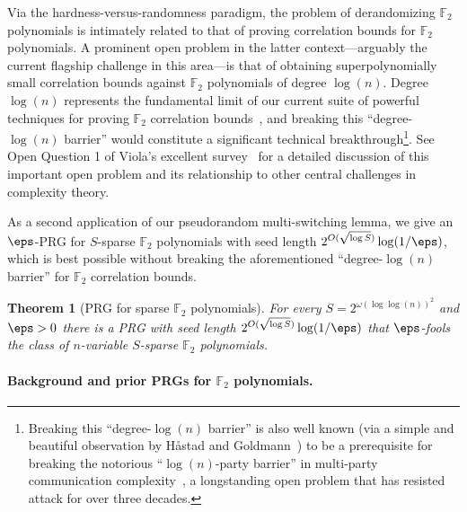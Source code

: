 \documentclass[11pt]{article}
\numberwithin{equation}{section}
\newtheorem{theorem}{Theorem}[section]
\theoremstyle{definition}
\theoremstyle{plain}
\theoremstyle{plain}
\renewcommand{\F}{\mathds{F}}
\begin{document}
Via the hardness-versus-randomness paradigm, the problem of derandomizing $\F_2$ polynomials is intimately related to that of proving correlation bounds for $\F_2$ polynomials.  A prominent open problem in the latter context---arguably the current flagship challenge in this area---is that of obtaining superpolynomially small correlation bounds against $\F_2$ polynomials of degree $\log(n)$.  Degree $\log(n)$ represents the fundamental limit of our current suite of powerful techniques for proving $\F_2$ correlation bounds~\cite{BNS92,Bou05,Cha07,VW07}, and breaking this %
``degree-$\log(n)$ barrier'' %
would constitute a significant technical breakthrough\footnote{Breaking this ``degree-$\log(n)$ barrier'' %
is also %
well known  %
(via a simple and beautiful observation
%
by  %
H{\aa}stad and Goldmann~\cite{HG91}) to be a prerequisite for breaking the notorious ``$\log(n)$-party %
barrier'' in multi-party communication complexity~\cite{BNS92}, a longstanding open problem that has resisted attack for over
%
three %
decades.}.  See Open Question 1 of Viola's excellent survey~\cite{Viola09now} for a detailed discussion of this important open problem and its relationship %
to  %
other central challenges in complexity theory.

As a second application of our pseudorandom multi-switching lemma, we give an $\eps$-PRG for $S$-sparse $\F_2$ polynomials with seed length $2^{O(\sqrt{\log S})}\log(1/\eps)$, which is best possible without breaking the aforementioned 
``degree-$\log(n)$ %
barrier'' for $\F_2$ correlation 
bounds. %


\begin{theorem}[PRG for sparse $\F_2$ polynomials] \label{thm:second}
For every $S =  2^{\omega(\log \log(n))^2}$ and $\eps > 0$ there is a PRG with seed length $2^{O(\sqrt{\log S})}\log(1/\eps)$ that $\eps$-fools the class of $n$-variable $S$-sparse $\F_2$ polynomials. 
\end{theorem}


\paragraph{Background and prior PRGs for $\F_2$ polynomials.}
\end{document}
